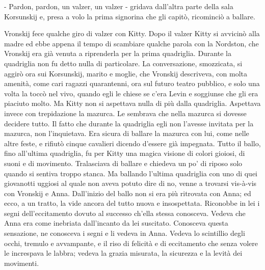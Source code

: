 - Pardon, pardon, un valzer, un valzer - gridava dall'altra parte della sala Korsunskij e, presa a volo la prima signorina che gli capitò, ricominciò a ballare. 

Vronskij fece qualche giro di valzer con Kitty. Dopo il valzer Kitty si avvicinò alla madre ed ebbe appena il tempo di scambiare qualche parola con la Nordston, che Vronskij era già venuta a riprenderla per la prima quadriglia. Durante la quadriglia non fu detto nulla di particolare. La conversazione, smozzicata, si aggirò ora sui Korsunskij, marito e moglie, che Vronskij descriveva, con molta amenità, come cari ragazzi quarantenni, ora sul futuro teatro pubblico, e solo una volta la toccò nel vivo, quando egli le chiese se c'era Levin e soggiunse che gli era piaciuto molto. Ma Kitty non si aspettava nulla di più dalla quadriglia. Aspettava invece con trepidazione la mazurca. Le sembrava che nella mazurca si dovesse decidere tutto. Il fatto che durante la quadriglia egli non l'avesse invitata per la mazurca, non l'inquietava. Era sicura di ballare la mazurca con lui, come nelle altre feste, e rifiutò cinque cavalieri dicendo d'essere già impegnata. Tutto il ballo, fino all'ultima quadriglia, fu per Kitty una magica visione di colori gioiosi, di suoni e di movimento. Tralasciava di ballare e chiedeva un po' di riposo solo quando si sentiva troppo stanca. Ma ballando l'ultima quadriglia con uno di quei giovanotti uggiosi al quale non aveva potuto dire di no, venne a trovarsi vis-à-vis con Vronskij e Anna. Dall'inizio del ballo non si era più ritrovata con Anna; ed ecco, a un tratto, la vide ancora del tutto nuova e insospettata. Riconobbe in lei i segni dell'eccitamento dovuto al successo ch'ella stessa conosceva. Vedeva che Anna era come inebriata dall'incanto da lei suscitato. Conosceva questa sensazione, ne conosceva i segni e li vedeva in Anna. Vedeva lo scintillio degli occhi, tremulo e avvampante, e il riso di felicità e di eccitamento che senza volere le increspava le labbra; vedeva la grazia misurata, la sicurezza e la levità dei movimenti. 

